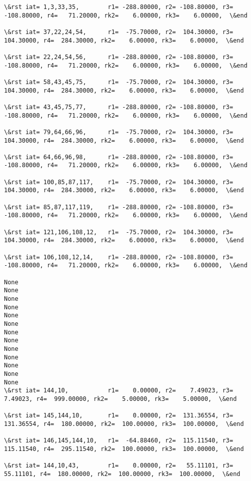 \documentclass[11pt]{article}
\begin{document}
\begin{Verbatim}[commandchars=\\\{\}]
\&rst iat= 1,3,33,35,        r1= -288.80000, r2= -108.80000, r3= -108.80000, r4=   71.20000, rk2=    6.00000, rk3=    6.00000,  \&end

\&rst iat= 37,22,24,54,      r1=  -75.70000, r2=  104.30000, r3=  104.30000, r4=  284.30000, rk2=    6.00000, rk3=    6.00000,  \&end

\&rst iat= 22,24,54,56,      r1= -288.80000, r2= -108.80000, r3= -108.80000, r4=   71.20000, rk2=    6.00000, rk3=    6.00000,  \&end

\&rst iat= 58,43,45,75,      r1=  -75.70000, r2=  104.30000, r3=  104.30000, r4=  284.30000, rk2=    6.00000, rk3=    6.00000,  \&end

\&rst iat= 43,45,75,77,      r1= -288.80000, r2= -108.80000, r3= -108.80000, r4=   71.20000, rk2=    6.00000, rk3=    6.00000,  \&end

\&rst iat= 79,64,66,96,      r1=  -75.70000, r2=  104.30000, r3=  104.30000, r4=  284.30000, rk2=    6.00000, rk3=    6.00000,  \&end

\&rst iat= 64,66,96,98,      r1= -288.80000, r2= -108.80000, r3= -108.80000, r4=   71.20000, rk2=    6.00000, rk3=    6.00000,  \&end

\&rst iat= 100,85,87,117,    r1=  -75.70000, r2=  104.30000, r3=  104.30000, r4=  284.30000, rk2=    6.00000, rk3=    6.00000,  \&end

\&rst iat= 85,87,117,119,    r1= -288.80000, r2= -108.80000, r3= -108.80000, r4=   71.20000, rk2=    6.00000, rk3=    6.00000,  \&end

\&rst iat= 121,106,108,12,   r1=  -75.70000, r2=  104.30000, r3=  104.30000, r4=  284.30000, rk2=    6.00000, rk3=    6.00000,  \&end

\&rst iat= 106,108,12,14,    r1= -288.80000, r2= -108.80000, r3= -108.80000, r4=   71.20000, rk2=    6.00000, rk3=    6.00000,  \&end

None
None
None
None
None
None
None
None
None
None
None
None
None
\&rst iat= 144,10,           r1=    0.00000, r2=    7.49023, r3=    7.49023, r4=  999.00000, rk2=    5.00000, rk3=    5.00000,  \&end

\&rst iat= 145,144,10,       r1=    0.00000, r2=  131.36554, r3=  131.36554, r4=  180.00000, rk2=  100.00000, rk3=  100.00000,  \&end

\&rst iat= 146,145,144,10,   r1=  -64.88460, r2=  115.11540, r3=  115.11540, r4=  295.11540, rk2=  100.00000, rk3=  100.00000,  \&end

\&rst iat= 144,10,43,        r1=    0.00000, r2=   55.11101, r3=   55.11101, r4=  180.00000, rk2=  100.00000, rk3=  100.00000,  \&end


\end{Verbatim}
\end{document}
